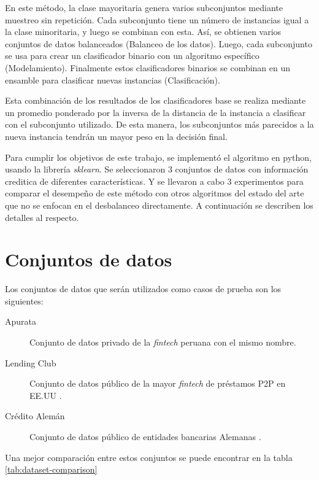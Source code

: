 En este método, la clase mayoritaria genera varios subconjuntos mediante muestreo sin repetición. Cada subconjunto tiene un número de instancias igual a la clase minoritaria, y luego se combinan con esta. Así, se obtienen varios conjuntos de datos balanceados (Balanceo de los datos). Luego, cada subconjunto se usa para crear un clasificador binario con un algoritmo específico (Modelamiento). Finalmente estos clasificadores binarios se combinan en un ensamble para clasificar nuevas instancias (Clasificación).

Esta combinación de los resultados de los clasificadores base se realiza mediante un promedio ponderado por la inversa de la distancia de la instancia a clasificar con el subconjunto utilizado. De esta manera, los subconjuntos más parecidos a la nueva instancia tendrán un mayor peso en la decisión final.

Para cumplir los objetivos de este trabajo, se implementó el algoritmo en python, usando la librería \textit{sklearn}. Se seleccionaron 3 conjuntos de datos con información creditica de diferentes características. Y se llevaron a cabo 3 experimentos para comparar el desempeño de este método con otros algoritmos del estado del arte que no se enfocan en el desbalanceo directamente. A continuación se describen los detalles al respecto.


\section{Conjuntos de datos}

Los conjuntos de datos que serán utilizados como casos de prueba son los siguientes:

\begin{description}
	\item[Apurata] Conjunto de datos privado de la \textit{fintech} peruana con el mismo nombre.
	\item[Lending Club] Conjunto de datos público de la mayor \textit{fintech} de préstamos \ac{P2P} en EE.UU \citep{dataset:lending-club}.
	\item[Crédito Alemán] Conjunto de datos público de entidades bancarias Alemanas \citep{dataset:german-credit}.
\end{description}

Una mejor comparación entre estos conjuntos se puede encontrar en la tabla \ref{tab:dataset-comparison}

